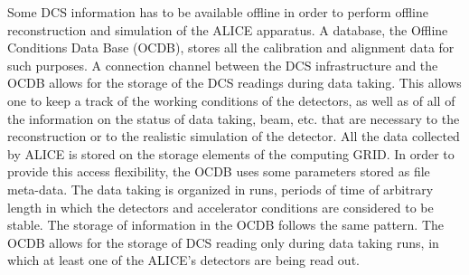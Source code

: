 Some DCS information has to be available offline in order to perform offline reconstruction and simulation of the ALICE apparatus.
A database, the Offline Conditions Data Base (OCDB), stores all the calibration and alignment data for such purposes.
A connection channel between the DCS infrastructure and the OCDB allows for the storage of the DCS readings during data taking.
This allows one to keep a track of the working conditions of the detectors, as well as of all of the information on the status of data taking, beam, etc. that are necessary to the reconstruction or to the realistic simulation of the detector.
All the data collected by ALICE is stored on the storage elements of the computing GRID.
In order to provide this access flexibility, the OCDB uses some parameters stored as file meta-data.
The data taking is organized in runs, periods of time of arbitrary length in which the detectors and accelerator conditions are considered to be stable.
The storage of information in the OCDB follows the same pattern.
The OCDB allows for the storage of DCS reading only during data taking runs, in which at least one of the ALICE's detectors are being read out.

